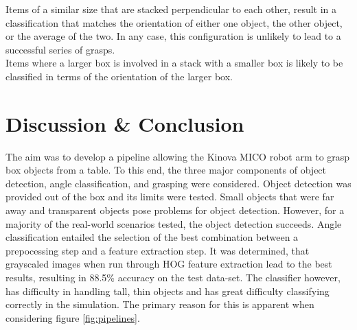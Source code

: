 \documentclass[letterpaper, 10 pt, conference]{conf/ieeeconf}  %
\begin{document}
Items of a similar size that are stacked perpendicular to each other, result in
a classification that matches the orientation of either one object, the other
object, or the average of the two. In any case, this configuration is unlikely
to lead to a successful series of grasps.\\

Items where a larger box is involved in a stack with a smaller box is likely to
be classified in terms of the orientation of the larger box.\\

\section{Discussion \& Conclusion}
\label{sec:discussion}
The aim was to develop a pipeline allowing the Kinova MICO robot arm to grasp
box objects from a table. To this end, the three major components of object
detection, angle classification, and grasping were considered. Object detection
was provided out of the box and its limits were tested. Small objects that were
far away and transparent objects pose problems for object detection. However,
for a majority of the real-world scenarios tested, the object detection
succeeds. Angle classification entailed the selection of the best combination
between a prepocessing step and a feature extraction step. It was determined,
that grayscaled images when run through HOG feature extraction lead to the best
results, resulting in 88.5\% accuracy on the test data-set. The classifier
however, has difficulty in handling tall, thin objects and has great difficulty
classifying correctly in the simulation. The primary reason for this is apparent
when considering figure \ref{fig:pipelines}.
\end{document}

